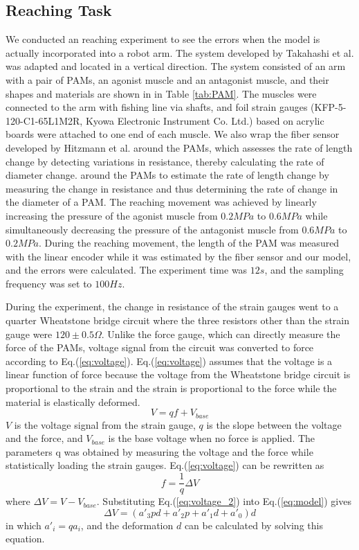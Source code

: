 \subsection{Reaching Task}
We conducted an reaching experiment to see the errors when the model is actually incorporated into a robot arm. The system developed by Takahashi et al.\cite{takahashi} was adapted and located in a vertical direction. The system consisted of an arm with a pair of PAMs, an agonist muscle and an antagonist muscle, and their shapes and materials are shown in in Table \ref{tab:PAM}. The muscles were connected to the arm with fishing line via shafts, and foil strain gauges (KFP-5-120-C1-65L1M2R, Kyowa Electronic Instrument Co. Ltd.) based on acrylic boards were attached to one end of each muscle.
We also wrap the fiber sensor developed by Hitzmann et al. \cite{fiber} around the PAMs, which assesses the rate of length change by detecting variations in resistance, thereby calculating the rate of diameter change. around the PAMs to estimate the rate of length change by measuring the change in resistance and thus determining the rate of change in the diameter of a PAM.
The reaching movement was achieved by linearly increasing the pressure of the agonist muscle from $0.2 \si{MPa}$ to $0.6 \si{MPa}$ while simultaneously decreasing the pressure of the antagonist muscle from $0.6 \si{MPa}$ to $0.2 \si{MPa}$. During the reaching movement, the length of the PAM was measured with the linear encoder while it was estimated by the fiber sensor and our model, and the errors were calculated. The experiment time was $12 \si{s}$, and the sampling frequency was set to $100 \si{Hz}$.

During the experiment, the change in resistance of the strain gauges went to a quarter Wheatstone bridge circuit where the three resistors other than the strain gauge were $120 \pm 0.5 \Omega$. Unlike the force gauge, which can directly measure the force of the PAMs, voltage signal from the circuit was converted to force according to Eq.(\ref{eq:voltage}). Eq.(\ref{eq:voltage}) assumes that the voltage is a linear function of force because the voltage from the Wheatstone bridge circuit is proportional to the strain\cite{wheatstone} and the strain is proportional to the force while the material is elastically deformed.
\begin{equation}
    \label{eq:voltage}
    V=qf+V_{base}
\end{equation}
$V$ is the voltage signal from the strain gauge, $q$ is the slope between the voltage and the force, and $V_{base}$ is the base voltage when no force is applied.
The parameters q was obtained by measuring the voltage and the force while statistically loading the strain gauges.
Eq.(\ref{eq:voltage}) can be rewritten as 
\begin{equation}
    \label{eq:voltage_2}
    f = \frac{1}{q}\Delta V
\end{equation}
where $\Delta V = V - V_{base}$. Substituting Eq.(\ref{eq:voltage_2}) into Eq.(\ref{eq:model}) gives
\begin{equation}
    \label{eq:model_voltage}
    \Delta V = (a'_3pd + a'_2p + a'_1d + a'_0)d
\end{equation}
in which $a'_i=qa_i$, and the deformation $d$ can be calculated by solving this equation.

